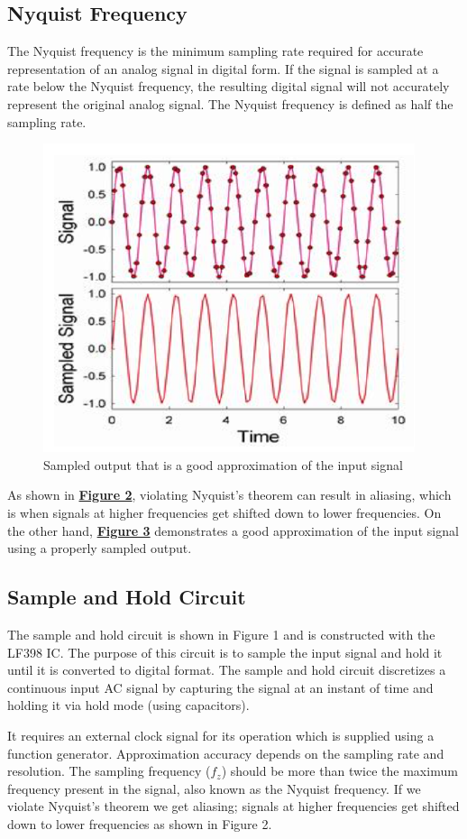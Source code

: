 	\subsection{Nyquist Frequency}

		The Nyquist frequency is the minimum sampling rate required for accurate representation of an analog signal in digital form. If the signal is sampled at a rate below the Nyquist frequency, the resulting digital signal will not accurately represent the original analog signal. The Nyquist frequency is defined as half the sampling rate.

		\begin{figure}[H]
			\centering
			\includegraphics[width=0.6\columnwidth]{images/theory2.png}
			\caption{Sampled output that is a good approximation of the input signal}
			\label{th:3}
		\end{figure}
		
		As shown in \hyperref[th:2]{\textbf{Figure 2}}, violating Nyquist's theorem can result in aliasing, which is when signals at higher frequencies get shifted down to lower frequencies. On the other hand, \hyperref[th:3]{\textbf{Figure 3}} demonstrates a good approximation of the input signal using a properly sampled output.

	\subsection{Sample and Hold Circuit}

		The sample and hold circuit is shown in Figure 1 and is constructed with the LF398 IC. The purpose of this circuit is to sample the input signal and hold it until it is converted to digital format. The sample and hold circuit discretizes a continuous input AC signal by capturing the signal at an instant of time and holding it via hold mode (using capacitors).

		It requires an external clock signal for its operation which is supplied using a function generator. Approximation accuracy depends on the sampling rate and resolution. The sampling frequency ($f_z$) should be more than twice the maximum frequency present in the signal, also known as the Nyquist frequency. If we violate Nyquist's theorem we get aliasing; signals at higher frequencies get shifted down to lower frequencies as shown in Figure 2.

